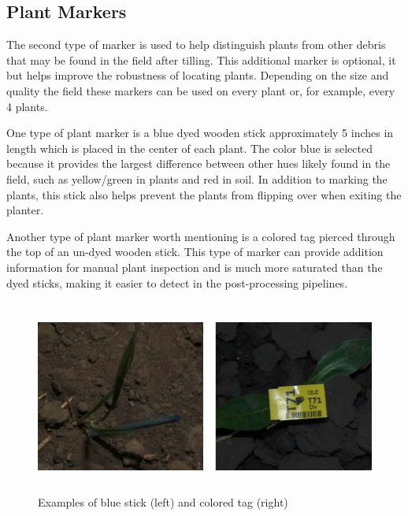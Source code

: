 \subsection{Plant Markers}
\label{section:plant_markers}

The second type of marker is used to help distinguish plants from other debris that may be found in the field after tilling.  This additional marker is optional, it but helps improve the robustness of locating plants.  Depending on the size and quality the field these markers can be used on every plant or, for example, every 4 plants. 

One type of plant marker is a blue dyed wooden stick approximately 5 inches in length which is placed in the center of each plant. The color blue is selected because it provides the largest difference between other hues likely found in the field, such as yellow/green in plants and red in soil.  In addition to marking the plants, this stick also helps prevent the plants from flipping over when exiting the planter.

Another type of plant marker worth mentioning is a colored tag pierced through the top of an un-dyed wooden stick.  This type of marker can provide addition information for manual plant inspection and is much more saturated than the dyed sticks, making it easier to detect in the post-processing pipelines. 

\begin{figure}
	\centering
    \includegraphics[height=2.5in]{figures/plant_markers.jpg}
    \caption[Plant markers]{Examples of blue stick (left) and colored tag (right)}
    \label{figure:plant_markers}
\end{figure}
